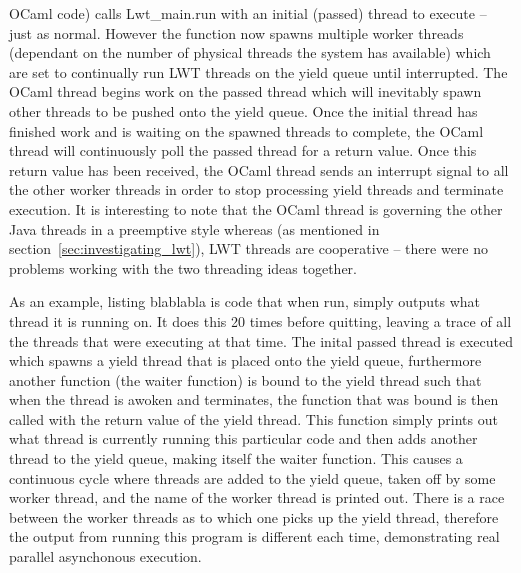 \documentclass[12pt,twoside,notitlepage]{report}
\begin{document}
OCaml code) calls Lwt\_main.run with an initial (passed) thread to execute -- just as normal. However the function now spawns multiple worker threads (dependant on the number of physical threads the system has available) which are set
to continually run LWT threads on the yield queue until interrupted. The OCaml thread begins work on the passed thread which will inevitably spawn other threads to be pushed onto the yield queue. Once the initial thread has finished
work and is waiting on the spawned threads to complete, the OCaml thread will continuously poll the passed thread for a return value. Once this return value has been received, the OCaml thread sends an interrupt signal to all the
other worker threads in order to stop processing yield threads and terminate execution.  It is interesting to note that the OCaml thread is governing the other Java threads in a preemptive style whereas (as mentioned in
section~\ref{sec:investigating_lwt}), LWT threads are cooperative -- there were no problems working with the two threading ideas together.

%
%
As an example, listing blablabla is code that when run, simply outputs what thread it is running on. It does this 20 times before quitting, leaving a trace of all the threads that
were executing at that time. The inital passed thread is executed which spawns a yield thread that is placed onto the yield queue, furthermore another function (the waiter function) is bound to the yield thread such that when the
thread is awoken and terminates, the function that was bound is then called with the return value of the yield thread. This function simply prints out what thread is currently running this particular code and then adds another thread
to the yield queue, making itself the waiter function. This causes a continuous cycle where threads are added to the yield queue, taken off by some worker thread, and the name of the worker thread is printed out. There is a race
between the worker threads as to which one picks up the yield thread, therefore the output from running this program is different each time, demonstrating real parallel asynchonous execution.
\end{document}
